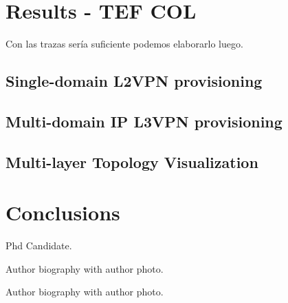 \documentclass[a4paper,fleqn]{cas-dc}
\begin{document}
\section{Results  - TEF COL}
\label{section:results}

Con las trazas sería suficiente podemos elaborarlo luego.

\subsection{Single-domain L2VPN provisioning}

\subsection{Multi-domain IP L3VPN provisioning}

\subsection{Multi-layer Topology Visualization}

\section{Conclusions}
\label{section:conclusions}

\printcredits

%






Phd Candidate.
\endbio

\bio{}
Author biography with author photo.
\endbio

\bio{}
Author biography with author photo.
\endbio
\end{document}
